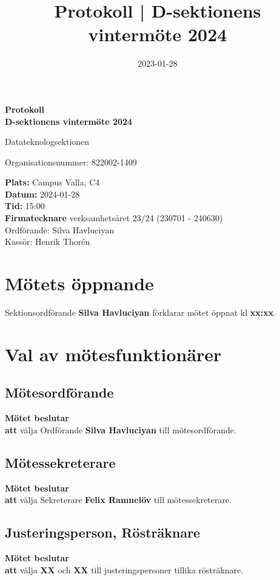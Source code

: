 \documentclass{datateknologsektionen-document}
\title{Protokoll | D-sektionens vintermöte 2024}
\date{2023-01-28}
\newcommand{\ind}{\hspace*{2em}}
\newcommand{\motetbeslutar}{\textbf{Mötet beslutar}}
\newcommand{\att}{\\\ind\textbf{att}}
\begin{document}
\hspace{0pt}
\vfill
\begin{center}
	\Huge\textbf{Protokoll \\ D-sektionens vintermöte 2024}

	\huge Datateknologsektionen

	\large
	Organisationsnummer: 822002-1409

\end{center}
\vfill
{\large
	\textbf{Plats:} Campus Valla, C4 \\
	\textbf{Datum:} 2024-01-28 \\
	\textbf{Tid:} 15:00 \\
	\textbf{Firmatecknare} verksamhetsåret 23/24 (230701 - 240630) \\
	\ind Ordförande: Silva Havluciyan \\
	\ind Kassör: Henrik Thorén
}
\vfill
\hspace{0pt}
\pagebreak




\tableofcontents
\pagebreak





\section{Mötets öppnande}
Sektionsordförande \textbf{Silva Havluciyan} förklarar mötet öppnat kl \textbf{xx:xx}.




\section{Val av mötesfunktionärer}
\subsection{Mötesordförande}
\motetbeslutar\att{} välja Ordförande \textbf{Silva Havluciyan} till mötesordförande.

\subsection{Mötessekreterare}
\motetbeslutar\att{} välja Sekreterare \textbf{Felix Ramnelöv} till mötessekreterare.

\subsection{Justeringsperson, Rösträknare}
\motetbeslutar\att{} välja \textbf{XX} och \textbf{XX} till justeringspersoner tillika rösträknare.
\end{document}
